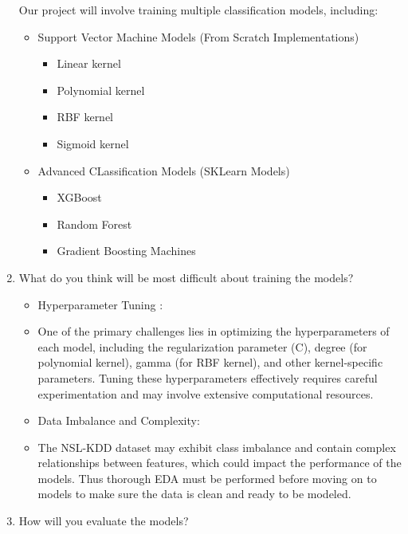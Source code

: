 \documentclass[11pt]{article}
\theoremstyle{definition}
\theoremstyle{theorem}
\newcommand{\response}{\medskip\noindent{\color{DarkBlue}\textbf{Response:}}}
\begin{document}
\begin{enumerate}
\response

Our project will involve training multiple classification models, including:

\begin{itemize}
	\item Support Vector Machine Models (From Scratch Implementations)
	\begin{itemize}
		\item Linear kernel
		\item Polynomial kernel
		\item RBF kernel
		\item Sigmoid kernel
	\end{itemize}
	\item Advanced CLassification Models (SKLearn Models)
	\begin{itemize}
		\item XGBoost
		\item Random Forest
		\item Gradient Boosting Machines
	\end{itemize}
\end{itemize}



\item What do you think will be most difficult about training the models?

\response

\begin{itemize}

	\item Hyperparameter Tuning :
	\item [] One of the primary challenges lies in optimizing the hyperparameters of each model, including the regularization parameter (C), degree (for polynomial kernel), gamma (for RBF kernel), and other kernel-specific parameters. Tuning these hyperparameters effectively requires careful experimentation and may involve extensive computational resources.

	\item Data Imbalance and Complexity: 
	\item [] The NSL-KDD dataset may exhibit class imbalance and contain complex relationships between features, which could impact the performance of the models. Thus thorough EDA must be performed before moving on to models to make sure the data is clean and ready to be modeled.
	
\end{itemize}


\newpage
\item How will you evaluate the models?


\end{enumerate}
\end{document}
